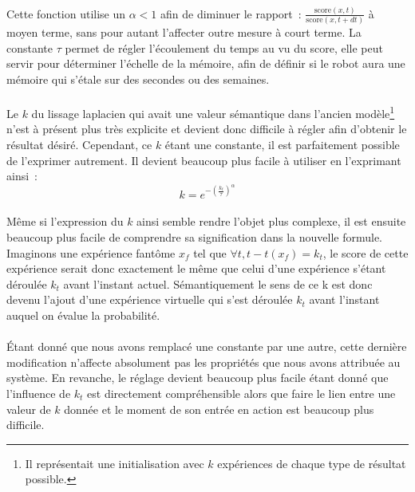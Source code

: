 \paragraph{}
Cette fonction utilise un $\alpha < 1$ afin de diminuer le rapport~:
$\frac{\mathrm{score}(x,t)}{\mathrm{score}(x, t + dt)}$ à moyen terme, sans
pour autant l'affecter outre mesure à court terme. La constante $\tau$ permet
de régler l'écoulement du temps au vu du score, elle peut servir pour
déterminer l'échelle de la mémoire, afin de définir si le robot aura une
mémoire qui s'étale sur des secondes ou des semaines.


\paragraph{}
Le $k$ du lissage laplacien qui avait une valeur sémantique dans l'ancien
modèle\footnote{Il représentait une initialisation avec $k$ expériences de
chaque type de résultat possible.} n'est à présent plus très explicite et
devient donc difficile à régler afin d'obtenir le résultat désiré. Cependant,
ce $k$ étant une constante, il est parfaitement possible de l'exprimer
autrement. Il devient beaucoup plus facile à utiliser en l'exprimant ainsi~:
$$k = e^{-\left (\frac{k_t}{\tau} \right )^{\alpha}}$$

\paragraph{}
Même si l'expression du $k$ ainsi semble rendre l'objet plus complexe, il est
ensuite beaucoup plus facile de comprendre sa signification dans la nouvelle
formule. Imaginons une expérience fantôme $x_f$ tel que
$\forall t, t - t(x_f) = k_t$, le score de cette expérience serait donc
exactement le même que celui d'une expérience s'étant déroulée $k_t$ avant
l'instant actuel. Sémantiquement le sens de ce k est donc devenu l'ajout d'une
expérience virtuelle qui s'est déroulée $k_t$ avant l'instant auquel on évalue
la probabilité.

\paragraph{}
Étant donné que nous avons remplacé une constante par une autre, cette
dernière modification n'affecte absolument pas les propriétés que nous avons
attribuée au système. En revanche, le réglage devient beaucoup plus facile
étant donné que l'influence de $k_t$ est directement compréhensible alors
que faire le lien entre une valeur de $k$ donnée et le moment de son entrée en
action est beaucoup plus difficile.


